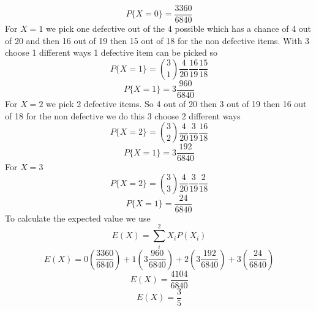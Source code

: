 \documentclass[11pt]{article}
\begin{document}
\begin{enumerate}
$$P\{X=0\} = \frac{3360}{6840}$$
For $X=1$ we pick one defective out of the 4 possible which has a chance of 4 out of 20 and then 16 out of 19 then 15 out of 18 for the non defective items. With 3 choose 1 different ways 1 defective item can be picked so
$$P\{X=1\} = {3\choose1}\frac{4}{20}\frac{16}{19}\frac{15}{18}$$
$$P\{X=1\} = 3\frac{960}{6840}$$
For $X=2$ we pick 2 defective items. So 4 out of 20 then 3 out of 19 then 16 out of 18 for the non defective we do this 3 choose 2 different ways
$$P\{X=2\} = {3\choose2}\frac{4}{20}\frac{3}{19}\frac{16}{18}$$
$$P\{X=1\} = 3\frac{192}{6840}$$
For $X=3$ 
$$P\{X=2\} = {3\choose3}\frac{4}{20}\frac{3}{19}\frac{2}{18}$$
$$P\{X=1\} = \frac{24}{6840}$$
To calculate the expected value we use
$$E(X) = \sum_{i}^{2}X_iP(X_i)$$
$$E(X) = 0\left(\frac{3360}{6840}\right)+1\left(3\frac{960}{6840}\right)+2\left(3\frac{192}{6840}\right)+3\left(\frac{24}{6840}\right)$$
$$E(X) = \frac{4104}{6840}$$
$$E(X) = \frac{3}{5}$$
\end{enumerate}
\end{document}
